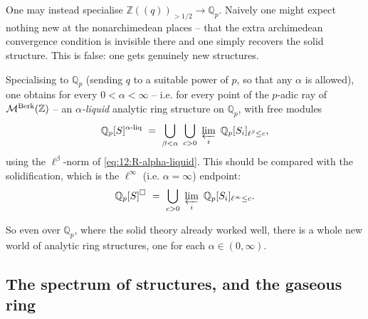 One may instead specialise $\mathbb{Z}(\!(q)\!)_{>1/2}\to\mathbb{Q}_p$. Naively
one might expect nothing new at the nonarchimedean places -- that the extra
archimedean convergence condition is invisible there and one simply recovers the
solid structure. This is false: one gets genuinely new structures.

\begin{definition}
\label{def:12:alpha-liquid-Qp}
Specialising to $\mathbb{Q}_p$ (sending $q$ to a suitable power of $p$, so that
any $\alpha$ is allowed), one obtains for every $0<\alpha<\infty$ -- i.e. for
every point of the $p$-adic ray of $\mathcal{M}^{\mathrm{Berk}}(\mathbb{Z})$ -- an
\emph{$\alpha$-liquid} analytic ring structure on $\mathbb{Q}_p$, with free
modules
\begin{equation*}
\mathbb{Q}_p[S]^{\alpha\text{-}\mathrm{liq}}\ =\
\bigcup_{\beta<\alpha}\ \bigcup_{c>0}\ \varprojlim_i\
\mathbb{Q}_p[S_i]_{\ell^{\beta}\le c},
\end{equation*}
using the $\ell^{\beta}$-norm of \eqref{eq:12:R-alpha-liquid}. This should be
compared with the solidification, which is the $\ell^{\infty}$ (i.e.
$\alpha=\infty$) endpoint:
\begin{equation*}
\mathbb{Q}_p[S]^{\solid}\ =\ \bigcup_{c>0}\ \varprojlim_i\
\mathbb{Q}_p[S_i]_{\ell^{\infty}\le c}.
\end{equation*}
\end{definition}

So even over $\mathbb{Q}_p$, where the solid theory already worked well, there is
a whole new world of analytic ring structures, one for each $\alpha\in(0,\infty)$.

\subsection{The spectrum of structures, and the gaseous ring}

